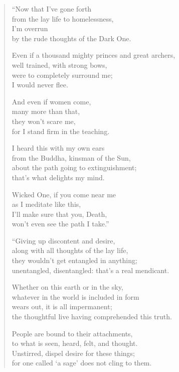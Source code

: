 \documentclass[12pt,openany]{book}%
\begin{document}
\begin{verse}%
“Now that I’ve gone forth \\
from the lay life to homelessness, \\
I’m overrun \\
by the rude thoughts of the Dark One. 

Even if a thousand mighty princes and great archers, \\
well trained, with strong bows, \\
were to completely surround me; \\
I would never flee. 

And even if women come, \\
many more than that, \\
they won’t scare me, \\
for I stand firm in the teaching. 

I heard this with my own ears \\
from the Buddha, kinsman of the Sun, \\
about the path going to extinguishment; \\
that’s what delights my mind. 

Wicked One, if you come near me \\
as I meditate like this, \\
I’ll make sure that you, Death, \\
won’t even see the path I take.” 

“Giving up discontent and desire, \\
along with all thoughts of the lay life, \\
they wouldn’t get entangled in anything; \\
unentangled, disentangled: that’s a real mendicant. 

Whether on this earth or in the sky, \\
whatever in the world is included in form \\
wears out, it is all impermanent; \\
the thoughtful live having comprehended this truth. 

People are bound to their attachments, \\
to what is seen, heard, felt, and thought. \\
Unstirred, dispel desire for these things; \\
for one called ‘a sage’ does not cling to them. 


\end{verse}
\end{document}

